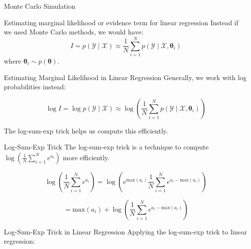 \documentclass{beamer}
\begin{document}
\begin{section}{Monte Carlo Simulation}
    \begin{frame}{Estimating marginal likelihood or evidence term for linear regression}
        Instead if we used Monte Carlo methods, we would have:
        \pause \begin{equation}
            I = p(\mathcal{Y} \mid \mathcal{X}) \approx \frac{1}{N} \sum_{i=1}^{N} p(\mathcal{Y} \mid \mathcal{X}, \boldsymbol{\theta}_i)
        \end{equation}
        where $\boldsymbol{\theta}_i \sim p(\boldsymbol{\theta})$.
    \end{frame}
        
        \begin{frame}{Estimating Marginal Likelihood in Linear Regression}
            Generally, we work with log probabilities instead:
            
            \begin{equation}
                \log I = \log p(\mathcal{Y} \mid \mathcal{X}) \approx \log\left(\frac{1}{N} \sum_{i=1}^{N} p(\mathcal{Y} \mid \mathcal{X}, \boldsymbol{\theta}_i)\right)
            \end{equation}
            
            The log-sum-exp trick helps us compute this efficiently.
        \end{frame}
        

        \begin{frame}{Log-Sum-Exp Trick}
            The log-sum-exp trick is a technique to compute $\log\left(\frac{1}{N} \sum_{i=1}^{N} e^{a_i}\right)$ more efficiently.
            
            \begin{equation}
                \log\left(\frac{1}{N} \sum_{i=1}^{N} e^{a_i}\right) = \log\left(e^{\text{max}(a_i)} \frac{1}{N} \sum_{i=1}^{N} e^{a_i - \text{max}(a_i)}\right)
            \end{equation}
            
            \pause
            \begin{equation}
                = \text{max}(a_i) + \log\left(\frac{1}{N} \sum_{i=1}^{N} e^{a_i - \text{max}(a_i)}\right)
            \end{equation}
        \end{frame}
        
        \begin{frame}{Log-Sum-Exp Trick in Linear Regression}
            Applying the log-sum-exp trick to linear regression:
            

\end{frame}
\end{section}
\end{document}

